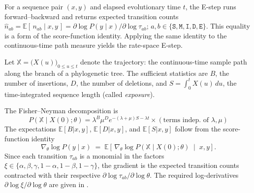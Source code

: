 \documentclass{article}
\newcommand{\E}{\mathbb{E}}
\newcommand{\ins}{\lambda}
\newcommand{\del}{\mu}
\newcommand{\hst}[1]{\texttt{#1}}
\begin{document}
For a sequence pair $(x,y)$ and elapsed evolutionary time $t$, the E-step runs
forward--backward and returns expected transition counts
$\hat n_{ab}=\E[\,n_{ab}\mid x,y\,]=\partial \log P(y\mid x)/\partial \log \tau_{ab}$; $a,b \in \{ \hst{S}, \hst{M}, \hst{I}, \hst{D}, \hst{E} \}$.
This equality is a form of the score-function identity. Applying the
same identity to the continuous-time path measure yields the rate-space E-step.

Let $\mathbb{X}=\bigl(X(u)\bigr)_{0\le u\le t}$ denote the trajectory: the continuous-time sample path along the branch of a phylogenetic tree.
The sufficient statistics are $B$, the number of insertions, $D$, the number of deletions, and $S=\int_0^t X(u)\,du$, the time-integrated sequence length (called \emph{exposure}).

The Fisher--Neyman decomposition is
\begin{equation*}
P(\mathbb{X}\mid X(0);\theta) = \ins^B \del^D e^{-(\ins+\del) S - \ins t} \times (\mbox{terms indep. of $\ins,\del$})
\end{equation*}
The expectations $\E[B|x,y]$, $\E[D|x,y]$, and $\E[S|x,y]$ follow from the score-function identity
\begin{equation}
\label{eq:score}
\nabla_\theta \log P(y\mid x)
  \;=\; \E\!\left[\,\nabla_\theta \log P(\mathbb{X}\mid X(0);\theta)
        \;\middle|\; x,y\right].
\end{equation}
Since each transition $\tau_{ab}$ is a monomial in the factors $\xi \in \{ \alpha,\beta,\gamma,1-\alpha,1-\beta,1-\gamma\}$, the
gradient is the expected transition counts contracted with
their respective $\partial \log \tau_{ab} / \partial \log \theta$.
The required log-derivatives $\partial\log\xi/\partial\log\theta$ are given in
.
\end{document}

